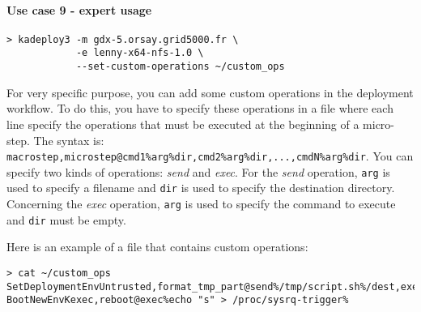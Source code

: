 \documentclass[a4wide,10pt,oneside]{book}
\begin{document}
\paragraph{Use case 9 - expert usage}
\begin{verbatim}
> kadeploy3 -m gdx-5.orsay.grid5000.fr \
            -e lenny-x64-nfs-1.0 \
            --set-custom-operations ~/custom_ops
\end{verbatim}
For very specific purpose, you can add some custom operations in the deployment workflow. To do this, you have to specify these operations in a file where each line specify the operations that must be executed at the beginning of a micro-step. The syntax is: \texttt{macrostep,microstep@cmd1\%arg\%dir,cmd2\%arg\%dir,...,cmdN\%arg\%dir}. You can specify two kinds of operations: \textit{send} and \textit{exec}. For the \textit{send} operation, \texttt{arg} is used to specify a filename and \texttt{dir} is used to specify the destination directory. Concerning the \textit{exec} operation, \texttt{arg} is used to specify the command to execute and \texttt{dir} must be empty.

Here is an example of a file that contains custom operations:
\begin{small}
\begin{verbatim}
> cat ~/custom_ops
SetDeploymentEnvUntrusted,format_tmp_part@send%/tmp/script.sh%/dest,exec%/dest/script.sh%
BootNewEnvKexec,reboot@exec%echo "s" > /proc/sysrq-trigger%
\end{verbatim}
\end{small}
\end{document}
